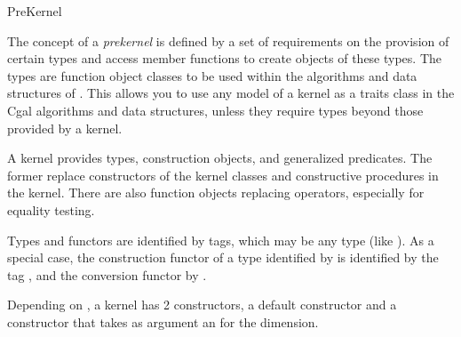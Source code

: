 \ccRefPageBegin


\begin{ccRefConcept}{PreKernel}


\ccDefinition
  
The concept of a {\em prekernel} is defined by a set of requirements on
the provision of certain types and access member functions to create
objects of these types. The types are function object classes to be used
within the algorithms and data structures of \cgal. This allows you to
use any model of a kernel as a traits class in the Cgal algorithms and
data structures, unless they require types beyond those provided by a
kernel.

A kernel provides types, construction objects, and generalized
predicates. The former replace constructors of the kernel classes and
constructive procedures in the kernel. There are also function objects
replacing operators, especially for equality testing. 

Types and functors are identified by tags, which may be any type (like
). As a special case, the construction functor of
a type identified by  is identified by the tag
, and the conversion functor by
.

Depending on , a kernel has 2
constructors, a default constructor and a constructor that takes as
argument an  for the dimension.


%

\ccTypes

\ccGlue
{}


\end{ccRefConcept}
